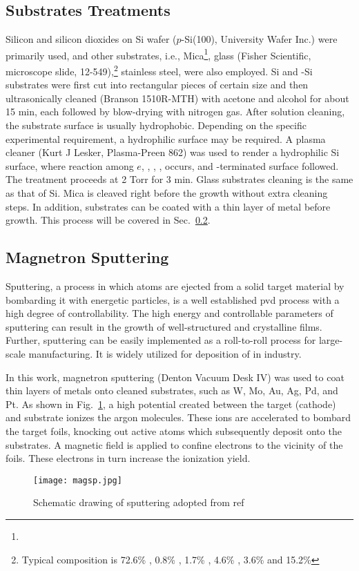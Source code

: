 \subsection{Substrates Treatments}\label{ch2sub}

Silicon and silicon dioxides on Si wafer ($p$-Si(100), University Wafer Inc.) were primarily used, and other substrates, i.e., Mica\footnote{}, glass (Fisher Scientific, microscope slide, 12-549),\footnote{Typical composition is 72.6\% , 0.8\% , 1.7\% , 4.6\% , 3.6\%  and 15.2\% } stainless steel, were also employed. Si and -Si substrates were first cut into rectangular pieces of certain size and then ultrasonically cleaned (Branson 1510R-MTH) with acetone and alcohol for about 15 min, each followed by blow-drying with nitrogen gas. After solution cleaning, the substrate surface is usually hydrophobic. Depending on the specific experimental requirement, a hydrophilic surface may be required. A plasma cleaner (Kurt J Lesker, Plasma-Preen 862) was used to render a hydrophilic Si surface, where reaction among $e$, , , , occurs, and -terminated surface followed.\cite{Habib2010} The treatment proceeds at 2 Torr  for 3 min. Glass substrates cleaning is the same as that of Si. Mica is cleaved right before the growth without extra cleaning steps. In addition, substrates can be coated with a thin layer of metal before growth. This process will be covered in Sec.~\ref{sec:mag}.

\subsection{Magnetron Sputtering}\label{sec:mag}
Sputtering, a process in which atoms are ejected from a solid target material by bombarding it with energetic particles, is a well established \gls{pvd} process with a high degree of controllability. The high energy and controllable parameters of sputtering can result in the growth of well-structured and crystalline films. Further, sputtering can be easily implemented as a roll-to-roll process for large-scale manufacturing. It is widely utilized for deposition of  in industry.

In this work, magnetron sputtering (Denton Vacuum Desk IV) was used to coat thin layers of metals onto cleaned substrates, such as W, Mo, Au, Ag, Pd, and Pt. As shown in Fig.~\ref{fig:ch2magsp}, a high potential created between the target (cathode) and substrate ionizes the argon molecules. These ions are accelerated to bombard the target foils, knocking out active atoms which subsequently deposit onto the substrates. A magnetic field is applied to confine electrons to the vicinity of the foils. These electrons in turn increase the ionization yield. 
\begin{figure}[htb]
\centering
\texttt{[image: magsp.jpg]}
\caption[magnetron sputtering system]{Schematic drawing of sputtering adopted from ref\cite{Song2008}}
\label{fig:ch2magsp}
\end{figure}

